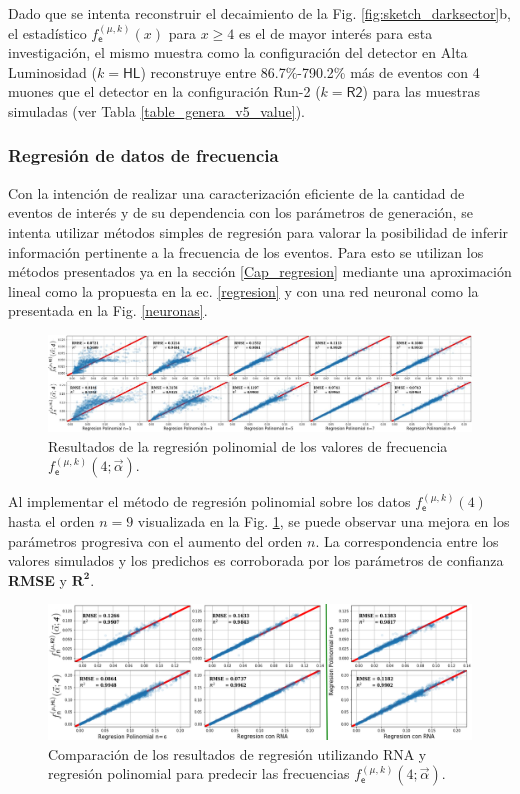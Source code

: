Dado que se intenta reconstruir el decaimiento de la Fig. \ref{fig:sketch_darksector}b, el estadístico $f^{(\mu, k)}_\textsf{e} (x)$ para $x \geq 4$ es el de mayor interés para esta investigación, el mismo muestra como la configuración del detector en Alta Luminosidad ($k=\textsf{HL}$) reconstruye entre 86.7\%-790.2\% más de eventos con 4 muones que el detector en la configuración Run-2 ($k=\textsf{R2}$) para las muestras simuladas (ver Tabla \ref{table_genera_v5_value}).





\subsubsection{Regresión de datos de frecuencia}

Con la intención de realizar una caracterización eficiente de la cantidad de eventos de interés y de su dependencia con los parámetros de generación, se intenta utilizar métodos simples de regresión para valorar la posibilidad de inferir información pertinente a la frecuencia de los eventos. Para esto se utilizan los métodos presentados ya en la sección \ref{Cap_regresion} mediante una aproximación lineal como la propuesta en la ec. \ref{regresion} y con una red neuronal como la presentada en la Fig. \ref{neuronas}.

\begin{figure}[!ht]
\centering
\includegraphics[width=1\textwidth]{Cap4/imagenes/ML_Entries3.png}
\caption{Resultados de la regresión polinomial de los valores de frecuencia $f^{(\mu, k)}_\textsf{e} (4;\vec{\alpha})$.}
\label{regresionALL}
\end{figure}


Al implementar el método de regresión polinomial sobre los datos $f^{(\mu, k)}_\textsf{e} (4)$ hasta el orden $n = 9$ visualizada en la Fig. \ref{regresionALL}, se puede observar una mejora en los parámetros progresiva con el aumento del orden $n$. La correspondencia entre los valores simulados y los predichos es corroborada por los parámetros de confianza \textbf{RMSE} y $\mathbf{R^2}$. 
\begin{figure}[!ht]
\centering
\includegraphics[width=.9\textwidth]{Cap4/imagenes/ML_Entries.png}
\caption{Comparación de los resultados de regresión utilizando RNA y regresión polinomial para predecir las frecuencias $f^{(\mu, k)}_\textsf{e} (4; \vec{\alpha})$.}
\label{regresionALL1}
\end{figure}

